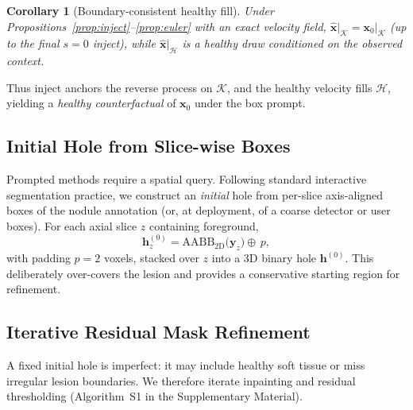 \documentclass[twoside]{article}
\newtheorem{corollary}{Corollary}
\newcommand{\suppAlgRefine}{Algorithm~S1}
\begin{document}
\begin{corollary}[Boundary-consistent healthy fill]
\label{cor:inpaint}
Under Propositions~\ref{prop:inject}--\ref{prop:euler} with an exact
velocity field,
\(\hat{\mathbf{x}}\big|_{\mathcal{K}}=\mathbf{x}_0\big|_{\mathcal{K}}\)
(up to the final \(s{=}0\) inject), while
\(\hat{\mathbf{x}}\big|_{\mathcal{H}}\) is a healthy draw conditioned on
the observed context.
\end{corollary}

Thus inject anchors the reverse process on \(\mathcal{K}\), and the healthy
velocity fills \(\mathcal{H}\), yielding a \emph{healthy counterfactual} of
\(\mathbf{x}_0\) under the box prompt.

\subsection{Initial Hole from Slice-wise Boxes}
\label{sec:method:init}

Prompted methods require a spatial query.
Following standard interactive segmentation practice, we construct an
\emph{initial} hole from per-slice axis-aligned boxes of the nodule annotation
(or, at deployment, of a coarse detector or user boxes).
For each axial slice \(z\) containing foreground,
\begin{equation}
\mathbf{h}^{(0)}_z
=
\mathrm{AABB}_{2\mathrm{D}}\!\bigl(\mathbf{y}_z\bigr)
\oplus\, p,
\end{equation}
with padding \(p{=}2\) voxels, stacked over \(z\) into a 3D binary hole
\(\mathbf{h}^{(0)}\).
This deliberately over-covers the lesion and provides a conservative starting
region for refinement.

\subsection{Iterative Residual Mask Refinement}
\label{sec:method:refine}

A fixed initial hole is imperfect: it may include healthy soft tissue or miss
irregular lesion boundaries.
We therefore iterate inpainting and residual thresholding
(\suppAlgRefine{} in the Supplementary Material).
\end{document}
